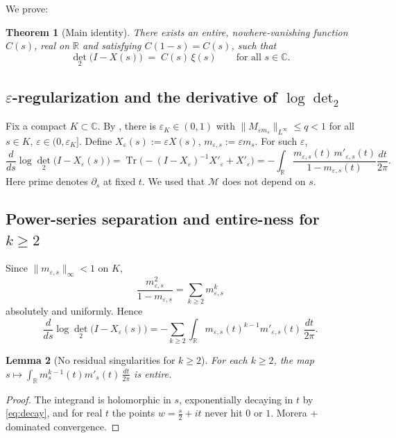 \documentclass[11pt]{article}
\numberwithin{equation}{section}
\newtheorem{theorem}{Theorem}[section]
\newtheorem{lemma}[theorem]{Lemma}
\theoremstyle{definition}
\theoremstyle{remark}
\newcommand{\C}{\mathbb{C}}
\newcommand{\R}{\mathbb{R}}
\newcommand{\eps}{\varepsilon}
\newcommand{\Tr}{\operatorname{Tr}}
\newcommand{\Dettwo}{\operatorname{det}_2}
\newcommand{\1}{\mathbbm{1}}
\newcommand{\cM}{\mathcal{M}}
\begin{document}
We prove:
\begin{theorem}[Main identity]\label{thm:Main}
There exists an entire, nowhere-vanishing function \(C(s)\), real on \(\R\) and satisfying \(C(1-s)=C(s)\), such that
\begin{equation}\label{eq:MainIdentity}
\Dettwo\!\big(I-X(s)\big) \;=\; C(s)\,\xi(s)\qquad \text{for all } s\in\C.
\end{equation}
\end{theorem}

\subsection{\texorpdfstring{$\eps$}{epsilon}-regularization and the derivative of \(\log\Dettwo\)}
Fix a compact \(K\subset\C\). By , there is \(\eps_K\in(0,1)\) with \(\|M_{\eps m_s}\|_{L^\infty}\le q<1\) for all \(s\in K\), \(\eps\in(0,\eps_K]\). Define \(X_\eps(s):=\eps X(s)\), \(m_{\eps,s}:=\eps m_s\). For such \(\eps\),
\begin{equation}\label{eq:det2-deriv}
\frac{d}{ds}\log \Dettwo\!\big(I-X_\eps(s)\big)
=\Tr\Big(-(I-X_\eps)^{-1}X'_\eps + X'_\eps\Big)
= -\int_{\R}\frac{m_{\eps,s}(t)\,m'_{\eps,s}(t)}{1-m_{\eps,s}(t)}\frac{dt}{2\pi}.
\end{equation}
Here prime denotes \(\partial_s\) at fixed \(t\). We used that \(\cM\) does not depend on \(s\).

\subsection{Power-series separation and entire-ness for \texorpdfstring{$k\ge2$}{k>=2}}

Since \(\|m_{\eps,s}\|_\infty<1\) on \(K\),
\[
\frac{m_{\eps,s}^2}{1-m_{\eps,s}}=\sum_{k\ge 2} m_{\eps,s}^k
\]
absolutely and uniformly. Hence
\begin{equation}\label{eq:kge2sum}
\frac{d}{ds}\log \Dettwo\!\big(I-X_\eps(s)\big)
= -\sum_{k\ge 2}\int_{\R} m_{\eps,s}(t)^{k-1} m'_{\eps,s}(t)\,\frac{dt}{2\pi}.
\end{equation}

\begin{lemma}[No residual singularities for \(k\ge 2\)]\label{lem:EntireKge2}
For each \(k\ge2\), the map \(s\mapsto \int_{\R} m_s^{k-1}(t) m'_s(t)\, \tfrac{dt}{2\pi}\) is entire.
\end{lemma}

\begin{proof}
The integrand is holomorphic in \(s\), exponentially decaying in \(t\) by \eqref{eq:decay}, and for real \(t\) the points \(w=\tfrac{s}{2}+it\) never hit \(0\) or \(1\). Morera + dominated convergence.
\end{proof}
\end{document}
